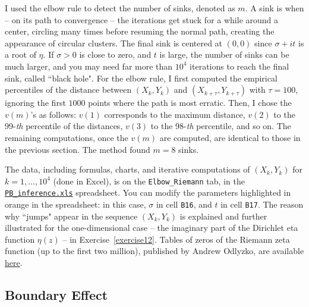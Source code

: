 \documentclass[10pt]{article}
\begin{document}
I used the elbow rule to detect the number of sinks, denoted as $m$. A sink is when -- on its path to convergence -- the iterations get stuck for a while around a center, circling many times before resuming the normal path, creating the appearance of circular clusters. The final sink is centered at $(0,0)$ since $\sigma+it$ is a root of $\eta$.
If $\sigma>0$ is close to zero, and $t$ is large, the number of sinks can be much larger, and you may need far more than $10^4$ iterations to reach the final sink, called ``black hole".
For the elbow rule, I first computed the empirical percentiles of the distance between
$(X_k, Y_k)$ and $(X_{k+\tau}, Y_{k+\tau})$ with $\tau=100$, ignoring the first $\num{1000}$ points where the path is most erratic. Then, I chose the $v(m)$'s as follows: $v(1)$ corresponds to the maximum distance, $v(2)$ to the 99-{\em th} percentile of the distances, $v(3)$ to the 98-{\em th} percentile, and so on. The remaining computations, once the $v(m)$ are computed, are identical to those in the previous section. The method found $m=8$ sinks.

The data, including formulas, charts, and iterative computations of $(X_k,Y_k)$ for $k=1,\dots,10^4$ (done in Excel), is on the
\texttt{Elbow\_Riemann} tab,
in the \href{https://github.com/VincentGranville/Point-Processes/tree/main/Spreadsheets}{\texttt{PB\_inference.xls}} spreadsheet. You can modify the parameters highlighted in orange in the spreadsheet: in this case, $\sigma$ in cell
\texttt{B16}, and $t$ in cell \texttt{B17}. The reason why ``jumps" appear in the sequence $(X_k,Y_k)$ is explained and further illustrated for the one-dimensional
case -- the imaginary part of the Dirichlet eta function $\eta(z)$ -- in Exercise~\ref{exercise12}.
Tables of zeros of the Riemann zeta function (up to the first two million), published by Andrew Odlyzko, are available \href{http://www.dtc.umn.edu/~odlyzko/zeta_tables/index.html}{here}.


\subsection{Boundary Effect}\label{boundary}
\end{document}
